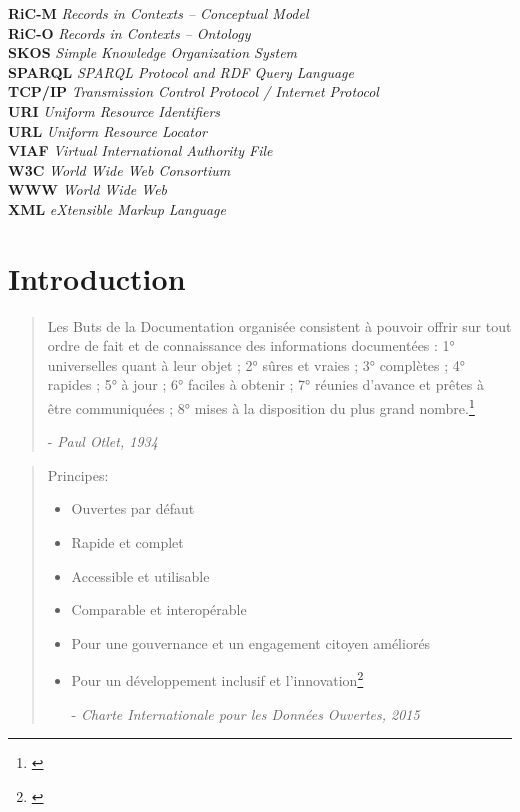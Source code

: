 \documentclass[a4paper,12pt,twoside]{book}
\begin{document}
\textbf{RiC-M}     \space\space\space\textit{Records in Contexts – Conceptual Model}\\
\textbf{RiC-O}     \space\space\space\textit{Records in Contexts – Ontology}\\
\textbf{SKOS}     \space\space\space\textit{Simple Knowledge Organization System}\\
\textbf{SPARQL}     \space\space\space\textit{SPARQL Protocol and RDF Query Language}\\
\textbf{TCP/IP}     \space\space\space\textit{Transmission Control Protocol / Internet Protocol}\\
\textbf{URI}     \space\space\space\textit{Uniform Resource Identifiers}\\
\textbf{URL}     \space\space\space\textit{Uniform Resource Locator}\\
\textbf{VIAF}     \space\space\space\textit{Virtual International Authority File}\\
\textbf{W3C}     \space\space\space\textit{World Wide Web Consortium}\\
\textbf{WWW}     \space\space\space\textit{World Wide Web}\\
\textbf{XML}     \space\space\space\textit{eXtensible Markup Language}\\
	\chapter{Introduction}
 \begin{quotation}
     \og Les Buts de la Documentation organisée consistent à pouvoir offrir sur tout ordre de fait et de connaissance des informations documentées : 1° universelles quant à leur objet ; 2° sûres et vraies ; 3° complètes ; 4° rapides ; 5° à jour ; 6° faciles à obtenir ; 7° réunies d’avance et prêtes à être communiquées ; 8° mises à la disposition du plus grand nombre.\fg\footnote{\cite[p.~6]{otletTraiteDocumentationLivre2021}}
     \begin{flushright}
     - \textit{Paul Otlet, 1934}
     \end{flushright}
 \end{quotation}
 \medskip
 \begin{quotation}
     \og Principes:
     \begin{itemize}
         \item Ouvertes par défaut
\item Rapide et complet
\item Accessible et utilisable
\item Comparable et interopérable
\item Pour une gouvernance et un engagement citoyen améliorés
\item Pour un développement inclusif et l'innovation\fg\footnote{\cite{CharteInternationaleDonnees2015}}
\begin{flushright}
    - \textit{Charte Internationale pour les Données Ouvertes, 2015}

\end{flushright}

     \end{itemize}


 \end{quotation}
\end{document}
